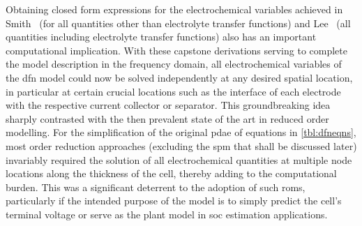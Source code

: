 Obtaining closed form expressions for  the electrochemical variables achieved in
Smith~\etal{} (for all quantities other than electrolyte transfer functions) and
Lee~\etal{} (all  quantities including electrolyte transfer  functions) also has
an important computational implication.  With these capstone derivations serving
to complete the  model description in the frequency  domain, all electrochemical
variables  of the  \gls{dfn}  model could  now be  solved  independently at  any
desired spatial location, in particular at certain crucial locations such as the
interface of each electrode with  the respective current collector or separator.
This groundbreaking idea sharply contrasted with the then prevalent state of the
art  in  reduced  order  modelling.  For  the  simplification  of  the  original
\gls{pdae} of  equations in \cref{tbl:dfneqns}, most  order reduction approaches
(excluding the \gls{spm} that shall  be discussed later) invariably required the
solution of all electrochemical quantities  at multiple node locations along the
thickness of  the cell, thereby adding  to the computational burden.  This was a
significant deterrent to  the adoption of such \glspl{rom},  particularly if the
intended purpose of  the model is to simply predict  the cell's terminal voltage
or serve as the plant model in \gls{soc} estimation applications.


